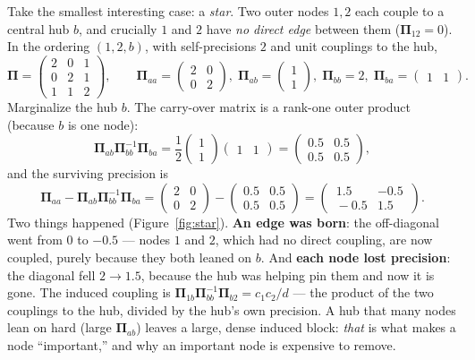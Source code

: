 \documentclass[11pt]{article}
\newcommand{\Prec}{\bm{\Pi}}        %
\theoremstyle{definition}
\begin{document}
Take the smallest interesting case: a \emph{star}. Two outer nodes $1,2$
each couple to a central hub $b$, and crucially $1$ and $2$ have
\emph{no direct edge} between them ($\Prec_{12}=0$). In the ordering
$(1,2,b)$, with self-precisions $2$ and unit couplings to the hub,
\begin{equation}
\Prec=\begin{pmatrix}2&0&1\\ 0&2&1\\ 1&1&2\end{pmatrix},
\qquad
\Prec_{aa}=\begin{pmatrix}2&0\\0&2\end{pmatrix},\;
\Prec_{ab}=\begin{pmatrix}1\\1\end{pmatrix},\;
\Prec_{bb}=2,\;
\Prec_{ba}=\begin{pmatrix}1&1\end{pmatrix}.
\end{equation}
Marginalize the hub $b$. The carry-over matrix is a rank-one outer product
(because $b$ is one node):
\begin{equation}
\Prec_{ab}\Prec_{bb}^{-1}\Prec_{ba}
=\frac{1}{2}\begin{pmatrix}1\\1\end{pmatrix}\begin{pmatrix}1&1\end{pmatrix}
=\begin{pmatrix}0.5&0.5\\0.5&0.5\end{pmatrix},
\end{equation}
and the surviving precision is
\begin{equation}
\Prec_{aa}-\Prec_{ab}\Prec_{bb}^{-1}\Prec_{ba}
=\begin{pmatrix}2&0\\0&2\end{pmatrix}-\begin{pmatrix}0.5&0.5\\0.5&0.5\end{pmatrix}
=\begin{pmatrix}\,1.5&-0.5\,\\[1pt]\,-0.5&1.5\,\end{pmatrix}.
\end{equation}
Two things happened (Figure~\ref{fig:star}). \textbf{An edge was born}: the
off-diagonal went from $0$ to $-0.5$ --- nodes $1$ and $2$, which had no
direct coupling, are now coupled, purely because they both leaned on $b$.
And \textbf{each node lost precision}: the diagonal fell $2\to1.5$, because
the hub was helping pin them and now it is gone. The induced coupling is
$\Prec_{1b}\Prec_{bb}^{-1}\Prec_{b2}=c_1 c_2/d$ --- the product of the two
couplings to the hub, divided by the hub's own precision. A hub that many
nodes lean on hard (large $\Prec_{ab}$) leaves a large, dense induced
block: \emph{that} is what makes a node ``important,'' and why an
important node is expensive to remove.
\end{document}
